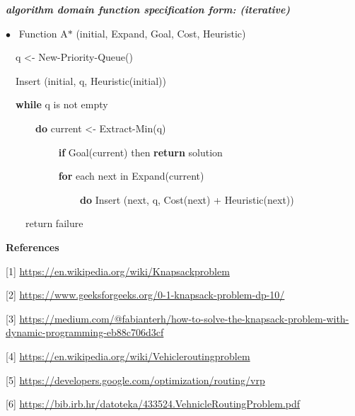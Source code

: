 \documentclass[12pt]{article}
\renewcommand{\_}{\kern-1.5pt\textunderscore\kern-1.5pt}
\begin{document}
\vspace{\baselineskip}
\begin{adjustwidth}{0.0in}{-0.01in}
\textbf{\textit{algorithm domain function speciﬁcation form:  (iterative)}}\par

\end{adjustwidth}

\textit{$\bullet$  }\  Function A$\ast$ (initial, Expand, Goal, Cost, Heuristic)\par

\ \  q <- New-Priority-Queue()\par

\ \  Insert (initial, q, Heuristic(initial))\par

\ \  \textbf{while} q is not empty\par

\ \ \ \ \ \  \textbf{do} current <- Extract-Min(q)\par

\ \ \ \ \ \ \ \ \ \  \textbf{ if} Goal(current) then \textbf{return} solution\par

\ \ \ \ \ \ \ \ \ \  \textbf{ for} each next in Expand(current)\par

\ \ \ \ \ \ \ \ \ \ \ \ \ \ \  \textbf{do} Insert (next, q, Cost(next) + Heuristic(next))\par

\ \ \ \  return failure\par

\begin{Center}
\textbf{References}
\end{Center}\par

[1] \href{https://en.wikipedia.org/wiki/Knapsack_problem#:~:text=The%20knapsack%20problem%20is%20a,is%20as%20large%20as%20possible.}{https://en.wikipedia.org/wiki/Knapsack\_problem}\par

[2] \href{https://www.geeksforgeeks.org/0-1-knapsack-problem-dp-10/}{https://www.geeksforgeeks.org/0-1-knapsack-problem-dp-10/}\par

[3] \href{https://medium.com/@fabianterh/how-to-solve-the-knapsack-problem-with-dynamic-programming-eb88c706d3cf}{https://medium.com/@fabianterh/how-to-solve-the-knapsack-problem-with-dynamic-programming-eb88c706d3cf}\par

[4] \href{https://en.wikipedia.org/wiki/Vehicle_routing_problem}{https://en.wikipedia.org/wiki/Vehicle\_routing\_problem}\par

[5] \href{https://developers.google.com/optimization/routing/vrp}{https://developers.google.com/optimization/routing/vrp}\par

[6] \href{https://bib.irb.hr/datoteka/433524.Vehnicle_Routing_Problem.pdf}{https://bib.irb.hr/datoteka/433524.Vehnicle\_Routing\_Problem.pdf}\par


\printbibliography
\end{document}
